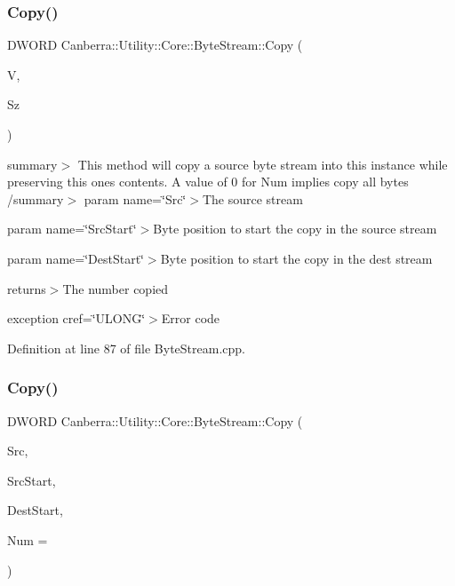 \subsubsection{\texorpdfstring{Copy()}{Copy()}\hspace{0.1cm}{\footnotesize\ttfamily [1/3]}}
{\footnotesize\ttfamily D\+W\+O\+RD Canberra\+::\+Utility\+::\+Core\+::\+Byte\+Stream\+::\+Copy (\begin{DoxyParamCaption}\item[{const char $\ast$const}]{V,  }\item[{D\+W\+O\+RD}]{Sz }\end{DoxyParamCaption})}

summary$>$ This method will copy a source byte stream into this instance while preserving this ones contents. A value of 0 for Num implies copy all bytes /summary$>$ param name=\char`\"{}\+Src\char`\"{}$>$The source stream

param name=\char`\"{}\+Src\+Start\char`\"{}$>$Byte position to start the copy in the source stream

param name=\char`\"{}\+Dest\+Start\char`\"{}$>$Byte position to start the copy in the dest stream

returns$>$The number copied

exception cref=\char`\"{}\+U\+L\+O\+N\+G\char`\"{}$>$Error code

Definition at line 87 of file Byte\+Stream.\+cpp.

\mbox{\label{class_canberra_1_1_utility_1_1_core_1_1_byte_stream_ac9a7219af83b6276b547a45ae0d15aeb_ac9a7219af83b6276b547a45ae0d15aeb}} 
\subsubsection{\texorpdfstring{Copy()}{Copy()}\hspace{0.1cm}{\footnotesize\ttfamily [2/3]}}
{\footnotesize\ttfamily D\+W\+O\+RD Canberra\+::\+Utility\+::\+Core\+::\+Byte\+Stream\+::\+Copy (\begin{DoxyParamCaption}\item[{\hyperlink{class_canberra_1_1_utility_1_1_core_1_1_byte_stream}{Byte\+Stream} \&}]{Src,  }\item[{D\+W\+O\+RD}]{Src\+Start,  }\item[{D\+W\+O\+RD}]{Dest\+Start,  }\item[{D\+W\+O\+RD}]{Num = {} }\end{DoxyParamCaption})}

